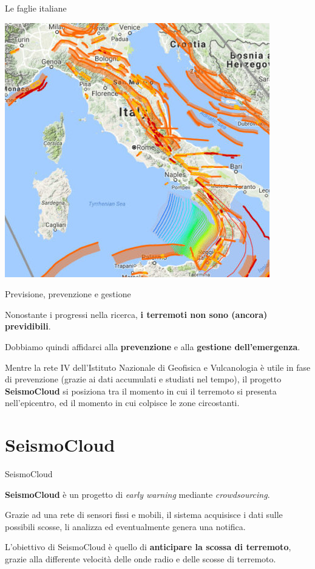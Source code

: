 \begin{frame}[c]{Le faglie italiane}
\begin{center}
\includegraphics[scale=0.4]{introduzione/mappa_faglie_italiane2}
\end{center}
\end{frame}

\begin{frame}[c]{Previsione, prevenzione e gestione}

Nonostante i progressi nella ricerca, \textbf{i terremoti non sono (ancora) previdibili}.

\vspace{0.5cm}
Dobbiamo quindi affidarci alla \textbf{prevenzione} e alla \textbf{gestione dell'emergenza}.

\vspace{0.5cm}
Mentre la rete IV dell'Istituto Nazionale di Geofisica e Vulcanologia è utile in fase di prevenzione (grazie ai dati accumulati e studiati nel tempo), il progetto \textbf{SeismoCloud} si posiziona tra il momento in cui il terremoto si presenta nell'epicentro, ed il momento in cui colpisce le zone circostanti.

\end{frame}

\section{SeismoCloud}

\begin{frame}[c]{SeismoCloud}

\textbf{SeismoCloud} è un progetto di \textit{early warning} mediante \textit{crowdsourcing}.

\vspace{0.5cm}
Grazie ad una rete di sensori fissi e mobili, il sistema acquisisce i dati sulle possibili scosse, li analizza ed eventualmente genera una notifica.

\vspace{0.5cm}
L'obiettivo di SeismoCloud è quello di \textbf{anticipare la scossa di terremoto}, grazie alla differente velocità delle onde radio e delle scosse di terremoto.

\end{frame}

